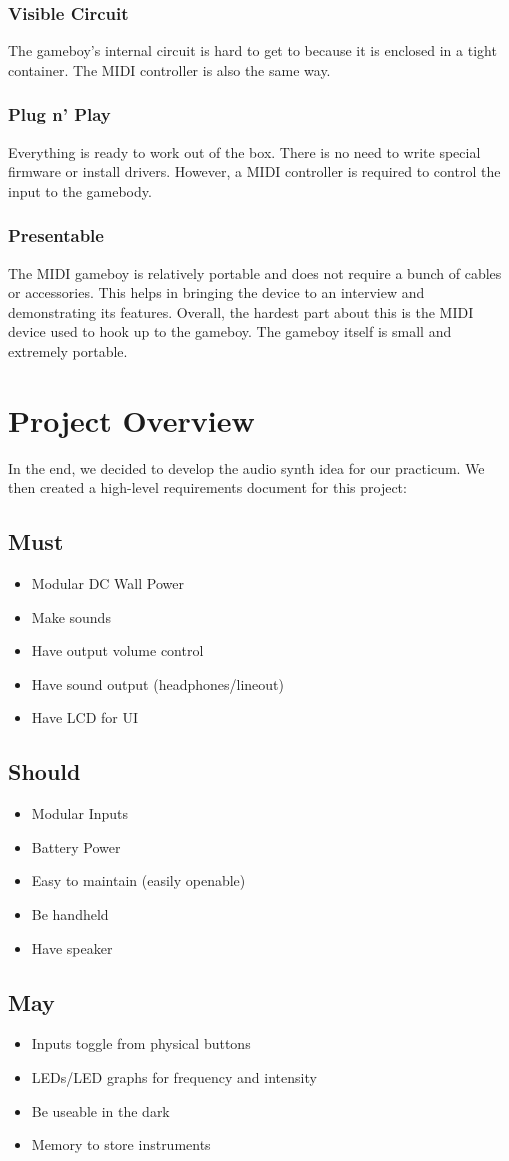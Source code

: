 \documentclass{article}
\begin{document}
\subsubsection{Visible Circuit}
The gameboy's internal circuit is hard to get to because it is
enclosed in a tight container. The MIDI controller is also the same
way.
\subsubsection{Plug n' Play}
Everything is ready to work out of the box. There is no need to write
special firmware or install drivers. However, a MIDI controller is
required to control the input to the gamebody.
\subsubsection{Presentable}
The MIDI gameboy is relatively portable and does not require a bunch
of cables or accessories. This helps in bringing the device to an
interview and demonstrating its features. Overall, the hardest part
about this is the MIDI device used to hook up to the gameboy. The
gameboy itself is small and extremely portable.
\section {Project Overview}

In the end, we decided to develop the audio synth idea for our
practicum. We then created a high-level requirements document for this
project:

\subsection{Must}
\begin{itemize}
\item Modular DC Wall Power
\item Make sounds
\item Have output volume control
\item Have sound output (headphones/lineout)
\item Have LCD for UI
\end{itemize}
\subsection{Should}
\begin{itemize}
\item Modular Inputs 
\item Battery Power
\item Easy to maintain (easily openable)
\item Be handheld
\item Have speaker
\end{itemize}
\subsection{May}
\begin{itemize}
\item Inputs toggle from physical buttons
\item LEDs/LED graphs for frequency and intensity
\item Be useable in the dark
\item Memory to store instruments
\end{itemize}
\end{document}
